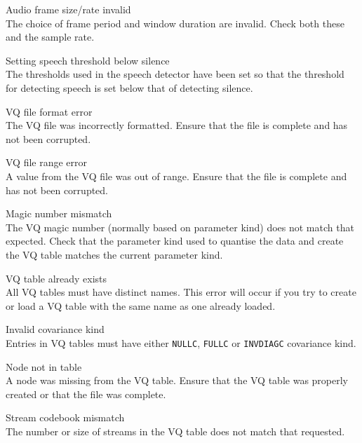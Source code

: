\begin{itemize}
\begin{itemize}
    Audio frame size/rate invalid\\
        The choice of frame period and window duration are invalid.  Check
        both these and the sample rate.

    Setting speech threshold below silence\\
        The thresholds used in the speech detector have been set so that the
        threshold for detecting speech is set below that of detecting silence.

\end{itemize}


\begin{itemize}
    VQ file format error\\
        The VQ file was incorrectly formatted.  Ensure that the file is 
        complete and has not been corrupted.

    VQ file range error\\
        A value from the VQ file was out of range.  Ensure that the file is 
        complete and has not been corrupted.

    Magic number mismatch\\
        The VQ magic number (normally based on parameter kind) does not match
        that expected.  Check that the parameter kind used to quantise the data
        and create the VQ table matches the current parameter kind.

    VQ table already exists\\
        All VQ tables must have distinct names.  This error will occur if you
        try to create or load a VQ table with the same name as one already
        loaded.

    Invalid covariance kind\\
        Entries in VQ tables must have either \texttt{NULLC}, \texttt{FULLC} or
        \texttt{INVDIAGC} covariance kind.

    Node not in table\\
        A node was missing from the VQ table.  Ensure that the VQ table was 
        properly created or that the file was complete.

    Stream codebook mismatch\\
        The number or size of streams in the VQ table does not match that 
        requested.

\end{itemize}


\end{itemize}
